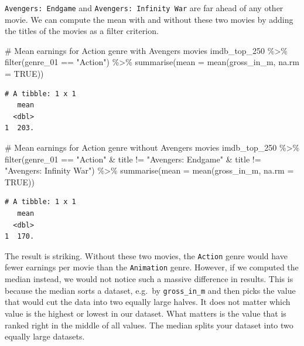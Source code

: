 \documentclass[
  letterpaper,
]{krantz}
\makeatletter
\newenvironment{Shaded}{\begin{snugshade}}{\end{snugshade}}
\newcommand{\AttributeTok}[1]{\textcolor[rgb]{0.40,0.45,0.13}{#1}}
\newcommand{\CommentTok}[1]{\textcolor[rgb]{0.37,0.37,0.37}{#1}}
\newcommand{\ConstantTok}[1]{\textcolor[rgb]{0.56,0.35,0.01}{#1}}
\newcommand{\FunctionTok}[1]{\textcolor[rgb]{0.28,0.35,0.67}{#1}}
\newcommand{\NormalTok}[1]{\textcolor[rgb]{0.00,0.23,0.31}{#1}}
\newcommand{\SpecialCharTok}[1]{\textcolor[rgb]{0.37,0.37,0.37}{#1}}
\newcommand{\StringTok}[1]{\textcolor[rgb]{0.13,0.47,0.30}{#1}}
\newenvironment{kframe}{%
\medskip{}
\setlength{\fboxsep}{.8em}
 \def\at@end@of@kframe{}%
 \ifinner\ifhmode%
  \def\at@end@of@kframe{\end{minipage}}%
  \begin{minipage}{\columnwidth}%
 \fi\fi%
 \def\FrameCommand##1{\hskip\@totalleftmargin \hskip-\fboxsep
 \colorbox{shadecolor}{##1}\hskip-\fboxsep
     \hskip-\linewidth \hskip-\@totalleftmargin \hskip\columnwidth}%
 \MakeFramed {\advance\hsize-\width
   \@totalleftmargin\z@ \linewidth\hsize
   \@setminipage}}%
 {\par\unskip\endMakeFramed%
 \at@end@of@kframe}
\renewenvironment{Shaded}{\begin{kframe}}{\end{kframe}}
\makeatother
\begin{document}
\texttt{Avengers:\ Endgame} and \texttt{Avengers:\ Infinity\ War} are
far ahead of any other movie. We can compute the mean with and without
these two movies by adding the titles of the movies as a filter
criterion.

\begin{Shaded}
\begin{Highlighting}[]
\CommentTok{\# Mean earnings for Action genre with Avengers movies}
\NormalTok{imdb\_top\_250 }\SpecialCharTok{\%\textgreater{}\%}
  \FunctionTok{filter}\NormalTok{(genre\_01 }\SpecialCharTok{==} \StringTok{"Action"}\NormalTok{) }\SpecialCharTok{\%\textgreater{}\%}
  \FunctionTok{summarise}\NormalTok{(}\AttributeTok{mean =} \FunctionTok{mean}\NormalTok{(gross\_in\_m, }\AttributeTok{na.rm =} \ConstantTok{TRUE}\NormalTok{))}
\end{Highlighting}
\end{Shaded}

\begin{verbatim}
# A tibble: 1 x 1
   mean
  <dbl>
1  203.
\end{verbatim}

\begin{Shaded}
\begin{Highlighting}[]
\CommentTok{\# Mean earnings for Action genre without Avengers movies}
\NormalTok{imdb\_top\_250 }\SpecialCharTok{\%\textgreater{}\%}
  \FunctionTok{filter}\NormalTok{(genre\_01 }\SpecialCharTok{==} \StringTok{"Action"} \SpecialCharTok{\&}
\NormalTok{           title }\SpecialCharTok{!=} \StringTok{"Avengers: Endgame"} \SpecialCharTok{\&}
\NormalTok{           title }\SpecialCharTok{!=} \StringTok{"Avengers: Infinity War"}\NormalTok{) }\SpecialCharTok{\%\textgreater{}\%}
  \FunctionTok{summarise}\NormalTok{(}\AttributeTok{mean =} \FunctionTok{mean}\NormalTok{(gross\_in\_m, }\AttributeTok{na.rm =} \ConstantTok{TRUE}\NormalTok{))}
\end{Highlighting}
\end{Shaded}

\begin{verbatim}
# A tibble: 1 x 1
   mean
  <dbl>
1  170.
\end{verbatim}

The result is striking. Without these two movies, the \texttt{Action}
genre would have fewer earnings per movie than the \texttt{Animation}
genre. However, if we computed the median instead, we would not notice
such a massive difference in results. This is because the median sorts a
dataset, e.g.~by \texttt{gross\_in\_m} and then picks the value that
would cut the data into two equally large halves. It does not matter
which value is the highest or lowest in our dataset. What matters is the
value that is ranked right in the middle of all values. The median
splits your dataset into two equally large datasets.
\end{document}
